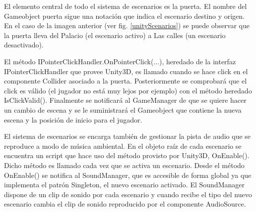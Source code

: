 El elemento central de todo el sistema de escenarios es la puerta. El nombre del Gameobject puerta sigue una notación que indica el escenario destino y origen. En el caso de la imagen anterior (ver fig. \ref{unityScenarios}) se puede observar que la puerta lleva del Palacio (el escenario activo) a Las calles (un escenario desactivado).

El método IPointerClickHandler.OnPointerClick(...), heredado de la interfaz IPointerClickHandler que provee Unity3D, es llamado cuando se hace click en el componente Collider asociado a la puerta. Posteriormente se comprobará que el click es válido (el jugador no está muy lejos por ejemplo) con el método heredado IsClickValid(). Finalmente se notificará al GameManager de que se quiere hacer un cambio de escena y se le suministrará el Gameobject que contiene la nueva escena y la posición de inicio para el jugador.

El sistema de escenarios se encarga también de gestionar la pista de audio que se reproduce a modo de música ambiental. En el objeto raíz de cada escenario se encuentra un script que hace uso del método provisto por Unity3D, OnEnable(). Dicho método es llamado cada vez que se activa un escenario. Desde el método OnEnable() se notifica al SoundManager, que es accesible de forma global ya que implementa el patrón Singleton, el nuevo escenario activado. El SoundManager dispone de un clip de sonido por cada escenario y cuando recibe el tipo del nuevo escenario cambia el clip de sonido reproducido por el componente AudioSource.